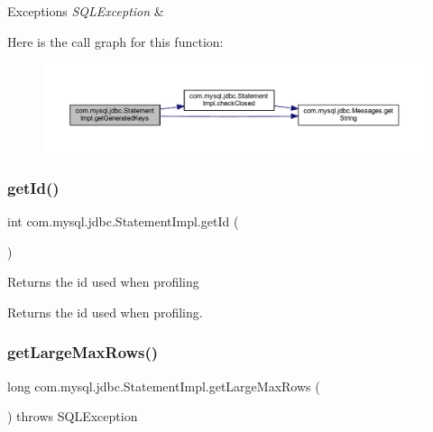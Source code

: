\begin{DoxyExceptions}{Exceptions}
{\em S\+Q\+L\+Exception} & \\
\hline
\end{DoxyExceptions}
Here is the call graph for this function\+:
\nopagebreak
\begin{figure}[H]
\begin{center}
\leavevmode
\includegraphics[width=350pt]{classcom_1_1mysql_1_1jdbc_1_1_statement_impl_a9c52b991cceda77bcab92b5e23026c23_cgraph}
\end{center}
\end{figure}
\mbox{\label{classcom_1_1mysql_1_1jdbc_1_1_statement_impl_a948e2b7dd749359c3babde0c6d9acb2a}} 
\subsubsection{\texorpdfstring{get\+Id()}{getId()}}
{\footnotesize\ttfamily int com.\+mysql.\+jdbc.\+Statement\+Impl.\+get\+Id (\begin{DoxyParamCaption}{ }\end{DoxyParamCaption})\hspace{0.3cm}{\ttfamily [protected]}}

Returns the id used when profiling

\begin{DoxyReturn}{Returns}
the id used when profiling. 
\end{DoxyReturn}
\mbox{\label{classcom_1_1mysql_1_1jdbc_1_1_statement_impl_a389a39b21dfb359636a9124ae91d6b86}} 
\subsubsection{\texorpdfstring{get\+Large\+Max\+Rows()}{getLargeMaxRows()}}
{\footnotesize\ttfamily long com.\+mysql.\+jdbc.\+Statement\+Impl.\+get\+Large\+Max\+Rows (\begin{DoxyParamCaption}{ }\end{DoxyParamCaption}) throws S\+Q\+L\+Exception}


